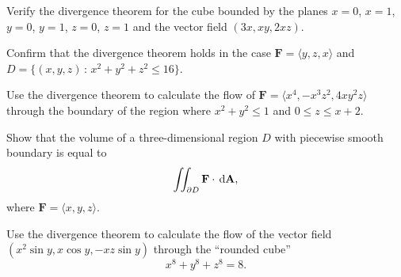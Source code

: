 \documentclass{watsonbook}
\begin{document}

\begin{aexercise}
  Verify the divergence theorem for the cube bounded by the planes
  $x=0$, $x=1$, $y=0$, $y=1$, $z=0$, $z=1$ and the vector field
  $(3x,xy,2xz)$.
\end{aexercise}

\begin{aexercise}
  Confirm that the divergence theorem holds in the case $\mathbf{F} =
  \langle y, z, x \rangle$ and $D = \{(x,y,z) \,: \, x^2 + y^2 + z^2
  \leq 16\}$. 
\end{aexercise}

\begin{aexercise}
  Use the divergence theorem to calculate the flow of $\mathbf{F} =
  \langle x^4, -x^3 z^2, 4xy^2 z \rangle$ through the boundary of the
  region where $x^2 + y^2 \leq 1$ and $0 \leq z
  \leq x + 2$. 
\end{aexercise}

\begin{aexercise}
  Show that the volume of a three-dimensional region $D$ with
  piecewise smooth boundary is equal to 
  \[
    \iint_{\partial D} \mathbf{F} \cdot \, {\mathrm{d}}\mathbf{A},
  \]
  where $\mathbf{F} =\langle x, y, z \rangle$. 
\end{aexercise}

\begin{aexercise}
  \begin{minipage}[t]{0.7\linewidth}
    Use the divergence theorem to calculate the flow of the vector
    field $(x^2 \sin y, x \cos y, -xz \sin y)$ through the ``rounded
    cube'' \[x^8 + y^8 + z^8 = 8.\]
  \end{minipage} 
  \begin{minipage}[t]{0.3\linewidth}
    \begin{center}
    \end{center}
  \end{minipage}
\end{aexercise}
\end{document}
